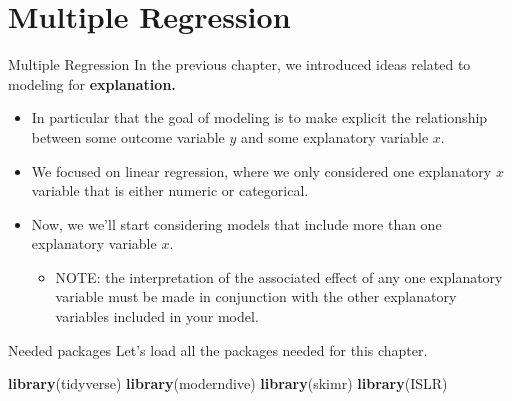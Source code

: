 \documentclass[
  ignorenonframetext,
]{beamer}
\newenvironment{Shaded}{\begin{snugshade}}{\end{snugshade}}
\newcommand{\FunctionTok}[1]{\textcolor[rgb]{0.13,0.29,0.53}{\textbf{#1}}}
\newcommand{\NormalTok}[1]{#1}
\providecommand{\tightlist}{%
  \setlength{\itemsep}{0pt}\setlength{\parskip}{0pt}}
\begin{document}
\section{Multiple Regression}\label{multiple-regression}

\begin{frame}{Multiple Regression}
\label{multiple-regression-1}
In the previous chapter, we introduced ideas related to modeling for
\textbf{explanation.}

\begin{itemize}
\item
  In particular that the goal of modeling is to make explicit the
  relationship between some outcome variable \(y\) and some explanatory
  variable \(x\).
\item
  We focused on linear regression, where we only considered one
  explanatory \(x\) variable that is either numeric or categorical.
\item
  Now, we we'll start considering models that include more than one
  explanatory variable \(x\).

  \begin{itemize}
  \tightlist
  \item
    NOTE: the interpretation of the associated effect of any one
    explanatory variable must be made in conjunction with the other
    explanatory variables included in your model.
  \end{itemize}
\end{itemize}
\end{frame}

\begin{frame}[fragile]{Needed packages}
\label{needed-packages-1}
Let's load all the packages needed for this chapter.

\normalsize

\begin{Shaded}
\begin{Highlighting}[]
\FunctionTok{library}\NormalTok{(tidyverse) }
\FunctionTok{library}\NormalTok{(moderndive)}
\FunctionTok{library}\NormalTok{(skimr)}
\FunctionTok{library}\NormalTok{(ISLR)}
\end{Highlighting}
\end{Shaded}

\normalsize
\end{frame}
\end{document}
